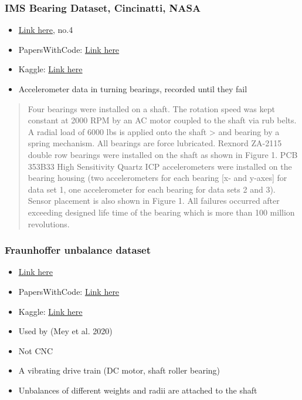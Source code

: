 \documentclass[
  letterpaper,
  DIV=11,
  numbers=noendperiod]{scrartcl}
\begin{document}
\hypertarget{ims-bearing-dataset-cincinatti-nasa}{%
\subsubsection{IMS Bearing Dataset, Cincinatti,
NASA}\label{ims-bearing-dataset-cincinatti-nasa}}

\begin{itemize}
\item
  \href{https://www.nasa.gov/content/prognostics-center-of-excellence-data-set-repository}{Link
  here}, no.4
\item
  PapersWithCode:
  \href{https://paperswithcode.com/dataset/ims-bearing-dataset}{Link
  here}
\item
  Kaggle:
  \href{https://www.kaggle.com/datasets/vinayak123tyagi/bearing-dataset}{Link
  here}
\item
  Accelerometer data in turning bearings, recorded until they fail
\end{itemize}

\begin{quote}
Four bearings were installed on a shaft. The rotation speed was kept
constant at 2000 RPM by an AC motor coupled to the shaft via rub belts.
A radial load of 6000 lbs is applied onto the shaft \textgreater{} and
bearing by a spring mechanism. All bearings are force lubricated.
Rexnord ZA-2115 double row bearings were installed on the shaft as shown
in Figure 1. PCB 353B33 High Sensitivity Quartz ICP accelerometers were
installed on the bearing housing (two accelerometers for each bearing
{[}x- and y-axes{]} for data set 1, one accelerometer for each bearing
for data sets 2 and 3). Sensor placement is also shown in Figure 1. All
failures occurred after exceeding designed life time of the bearing
which is more than 100 million revolutions.
\end{quote}

\hypertarget{fraunhoffer-unbalance-dataset}{%
\subsubsection{Fraunhoffer unbalance
dataset}\label{fraunhoffer-unbalance-dataset}}

\begin{itemize}
\item
  \href{https://fordatis.fraunhofer.de/handle/fordatis/151.3}{Link here}
\item
  PapersWithCode:
  \href{https://paperswithcode.com/dataset/unbalance-classification-using-vibration-data}{Link
  here}
\item
  Kaggle:
  \href{https://www.kaggle.com/datasets/vinayak123tyagi/bearing-dataset}{Link
  here}
\item
  Used by (Mey et al. 2020)
\item
  Not CNC
\item
  A vibrating drive train (DC motor, shaft roller bearing)
\item
  Unbalances of different weights and radii are attached to the shaft
\end{itemize}
\end{document}
